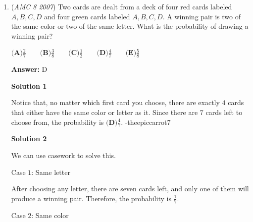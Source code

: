 \begin{enumerate}
\textbf{Solution 4}

At the start of the problem we figure out the Unicorns have won $45\%$ of their games, which can be represented by $\frac9{20}$. Since this is a simplified fraction and not necessarily the amount of games they have played, we can add a variable (in this case I am using $x$) to the numerator and denominator to get $\frac{9x}{20x}$. We then know that during the district play they have won 6 more games and lost 2 of them for a total of 6+2=8 games played. We then can add it to our fraction we have built to make $\frac{9x+6}{20x+8}$. We also know that the fraction is equal to $\frac1{2}$. Putting these equations together we get  $\frac{9x+6}{20x+8}=\frac1{2}$. Now we can cross multiply to come out with $18x+12=20x+8$. We now solve for $x$!$18x+12=20x+8$ ----> $4=2x$ ----> $2=x$. After we get $x$ which comes out to be 2 we then plug it back into the denominator to get $20(2)+8$ which is equal to 48, so the answer must be $\boxed{\textbf{(A)} 48}$. 

 


	\item (\textit{AMC 8 2007}) Two cards are dealt from a deck of four red cards labeled $A, B, C, D$ and four
green cards labeled $A, B, C, D$. A winning pair is two of the same color or two
of the same letter. What is the probability of drawing a winning pair?


 $\textbf{(A)} \frac{2}{7} \qquad \textbf{(B)} \frac{3}{8} \qquad \textbf{(C)} \frac{1}{2} \qquad \textbf{(D)} \frac{4}{7} \qquad \textbf{(E)} \frac{5}{8}$

 \textbf{Answer: }D



\textbf{Solution 1}

Notice that, no matter which first card you choose, there are exactly $4$ cards that either have the same color or letter as it. Since there are $7$ cards left to choose from, the probability is $\boxed{\textbf{(D)}\frac47}$. -theepiccarrot7

 



\textbf{Solution 2}

We can use casework to solve this.

 Case $1$: Same letter

 After choosing any letter, there are seven cards left, and only one of them will produce a winning pair. Therefore, the probability is $\frac17$.

 
Case $2$: Same color


\end{enumerate}

